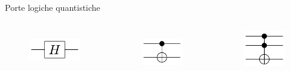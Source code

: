 \documentclass{beamer}
\begin{document}
\begin{frame}{Porte logiche quantistiche}
        \begin{columns}
            \begin{figure}[h]
                \centering
                \includegraphics[width=\columnwidth]{gfx/Hadamard_gate}
                \label{fig:hadamard}
            \end{figure}
            \begin{figure}[h]
                \centering
                \includegraphics[width=\columnwidth]{gfx/CNOT_gate}                
                \label{fig:cnot}
            \end{figure}
            \begin{figure}[h]
                \centering
                \includegraphics[width=\columnwidth]{gfx/Toffoli_gate}                

\end{figure}
\end{columns}
\end{frame}
\end{document}
